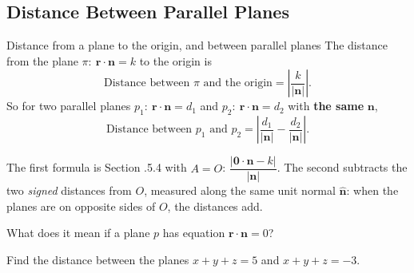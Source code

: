 \clearpage
\subsection{Distance Between Parallel Planes}
\begin{definition}{{Distance from a plane to the origin, and between parallel planes}}
The distance from the plane $\pi:\ \mathbf{r}\cdot\mathbf{n} = k$ to the origin is
\[
\text{Distance between $\pi$ and the origin} = \left|\dfrac{k}{|\mathbf{n}|}\right|.
\]
So for two parallel planes $p_1:\ \mathbf{r}\cdot\mathbf{n} = d_1$ and $p_2:\ \mathbf{r}\cdot\mathbf{n} = d_2$ with \textbf{the same} $\mathbf{n}$,
\[
\text{Distance between $p_1$ and $p_2$} = \left|\dfrac{d_1}{|\mathbf{n}|} - \dfrac{d_2}{|\mathbf{n}|}\right|.
\]
\end{definition}
The first formula is Section \chapnum.5.4 with $A = O$: $\dfrac{|\mathbf{0}\cdot\mathbf{n} - k|}{|\mathbf{n}|}$. The second subtracts the two \emph{signed} distances from $O$, measured along the same unit normal $\hat{\mathbf{n}}$: when the planes are on opposite sides of $O$, the distances add.

\begin{center}
\end{center}

\begin{question}
What does it mean if a plane $p$ has equation $\mathbf{r}\cdot\mathbf{n} = 0$?
\end{question}

\begin{example}[label=ex:5.18]
Find the distance between the planes $x + y + z = 5$ and $x + y + z = -3$.
\end{example}

